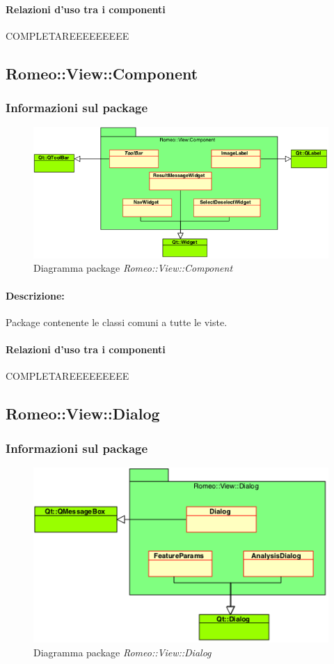 			\paragraph{Relazioni d'uso tra i componenti}
COMPLETAREEEEEEEEE	\subsection{Romeo::View::Component}
		\subsubsection{Informazioni sul package}
			\begin{figure}[!h]
				\centering
				\includegraphics[scale=0.5]{./Content/Immagini/Romeo__View__Component.png}
				\caption{Diagramma package \textsl{Romeo::View::Component}}
			\end{figure}
			\paragraph{Descrizione:}Package\g{} contenente le classi comuni a tutte le viste.
			\paragraph{Relazioni d'uso tra i componenti}
COMPLETAREEEEEEEEE	\subsection{Romeo::View::Dialog}
		\subsubsection{Informazioni sul package}
			\begin{figure}[!h]
				\centering
				\includegraphics[scale=0.5]{./Content/Immagini/Romeo__View__Dialog.png}
				\caption{Diagramma package \textsl{Romeo::View::Dialog}}
			\end{figure}
